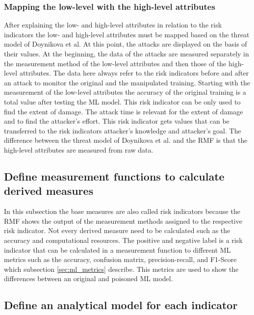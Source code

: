 \subsubsection*{Mapping the low-level with the high-level attributes}
\label{sec:map_low_high}

After explaining the low- and high-level attributes in relation to the risk indicators the low- and high-level attributes must be mapped based on the threat model of Doynikova et al. At this point, the attacks are displayed on the basis of their values. At the beginning, the data of the attacks are measured separately in the measurement method of the low-level attributes and then those of the high-level attributes. The data here always refer to the risk indicators before and after an attack to monitor the original and the manipulated training. Starting with the measurement of the low-level attributes the accuracy of the original training is a total value after testing the ML model. This risk indicator can be only used to find the extent of damage. The attack time is relevant for the extent of damage and to find the attacker's effort. This risk indicator gets values that can be transferred to the risk indicators attacker's knowledge and attacker's goal. The difference between the threat model of Doynikova et al. and the RMF is that the high-level attributes are measured from raw data.

\subsection{Define measurement functions to calculate derived measures}
\label{sec:derived_measures}

In this subsection the base measures are also called risk indicators because the RMF shows the output of the measurement methods assigned to the respective risk indicator. Not every derived measure need to be calculated such as the accuracy and computational resources. The positive and negative label is a risk indicator that can be calculated in a measurement function to different ML metrics such as the accuracy, confusion matrix, precision-recall, and F1-Score \cite{9783960101925} which subsection \ref{sec:ml_metrics} describe. This metrics are used to show the differences between an original and poisoned ML model.

\subsection{Define an analytical model for each indicator}

